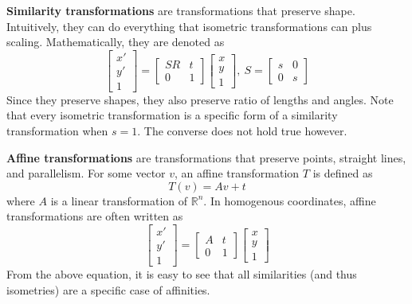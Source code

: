 \documentclass[a4paper, 12pt]{article}
\renewcommand\emph{\textbf}
\begin{document}
\emph{Similarity transformations} are transformations that preserve shape. Intuitively, they can do everything that isometric transformations can plus scaling. Mathematically, they are denoted as 
\begin{equation*}
    \begin{bmatrix}x'\\y'\\1\end{bmatrix} = \begin{bmatrix}SR & t\\ 0 & 1\end{bmatrix}\begin{bmatrix}x\\y\\1\end{bmatrix},\ S = \begin{bmatrix}s & 0\\ 0 & s\end{bmatrix}
\end{equation*}
Since they preserve shapes, they also preserve ratio of lengths and angles. Note that every isometric transformation is a specific form of a similarity transformation when $s=1$. The converse does not hold true however.

\emph{Affine transformations} are transformations that preserve points, straight lines, and parallelism. For some vector $v$, an affine transformation $T$ is defined as 
\begin{equation*}
    T(v) = Av + t
\end{equation*}
where $A$ is a linear transformation of $\mathbb{R}^n$. In homogenous coordinates, affine transformations are often written as
\begin{equation*}
    \begin{bmatrix}x'\\y'\\1\end{bmatrix} = \begin{bmatrix}A & t\\ 0 & 1\end{bmatrix}\begin{bmatrix}x\\y\\1\end{bmatrix}
\end{equation*}
From the above equation, it is easy to see that all similarities (and thus isometries) are a specific case of affinities.
\end{document}
